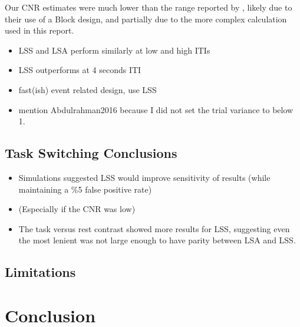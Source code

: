 \documentclass[10pt,letterpaper]{article}
\begin{document}
Our CNR estimates were much lower than the range reported by \cite[Welvaert]{Welvaert2013a}, likely
due to their use of a Block design, and partially due to the more complex calculation
used in this report.
\begin{itemize}
  \item LSS and LSA perform similarly at low and high ITIs
  \item LSS outperforms at 4 seconds ITI
  \item fast(ish) event related design, use LSS
  \item mention Abdulrahman2016 because I did not set the trial variance to below 1.
\end{itemize}

\subsection*{Task Switching Conclusions}
\begin{itemize}
  \item Simulations suggested LSS would improve sensitivity of results (while maintaining a \%5 false positive rate)
  \item (Especially if the CNR was low)
  \item The task versus rest contrast showed more results for LSS,
        suggesting even the most lenient was not large enough
        to have parity between LSA and LSS.
\end{itemize}

\subsection{Limitations}
\section*{Conclusion}


\end{document}
